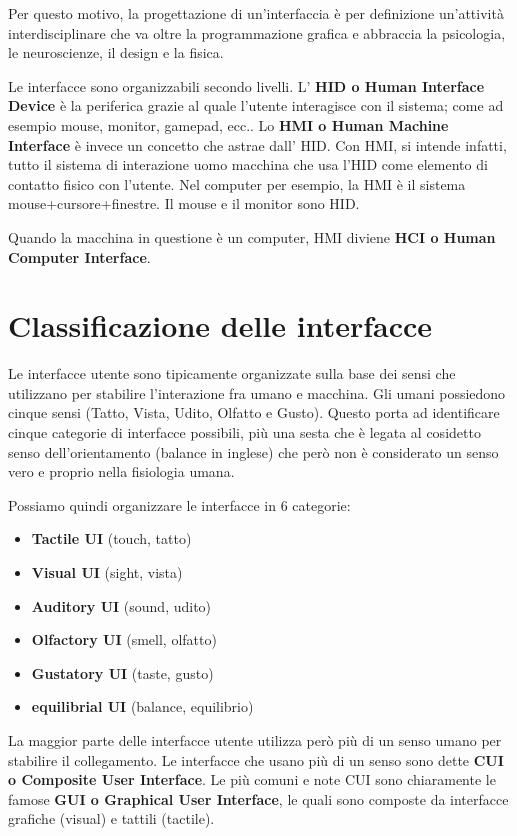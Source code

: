 Per questo motivo, la progettazione di un'interfaccia è per definizione un'attività interdisciplinare che va oltre la programmazione grafica e abbraccia la psicologia, le neuroscienze, il design e la fisica.

Le interfacce sono organizzabili secondo livelli. L' \textbf{HID o Human Interface Device} è la periferica grazie al quale l'utente interagisce con il sistema; come ad esempio mouse, monitor, gamepad, ecc.. Lo \textbf{HMI o Human Machine Interface} è invece un concetto che astrae dall' HID. Con HMI, si intende infatti, tutto il sistema di interazione uomo macchina che usa l'HID come elemento di contatto fisico con l'utente. Nel computer per esempio, la HMI è il sistema mouse+cursore+finestre. Il mouse e il monitor sono HID.

Quando la macchina in questione è un computer, HMI diviene \textbf{HCI o Human Computer Interface}.

\section{Classificazione delle interfacce}
Le interfacce utente sono tipicamente organizzate sulla base dei sensi che utilizzano per stabilire l'interazione fra umano e macchina. Gli umani possiedono cinque sensi (Tatto, Vista, Udito, Olfatto e Gusto). Questo porta ad identificare cinque categorie di interfacce possibili, più una sesta che è legata al cosidetto senso dell'orientamento (balance in inglese) che però non è considerato un senso vero e proprio nella fisiologia umana.

Possiamo quindi organizzare le interfacce in 6 categorie:
\begin{itemize}
	\item \textbf{Tactile UI} (touch, tatto)
	\item \textbf{Visual UI} (sight, vista)
	\item \textbf{Auditory UI} (sound, udito)
	\item \textbf{Olfactory UI} (smell, olfatto)
	\item \textbf{Gustatory UI} (taste, gusto)
	\item \textbf{equilibrial UI} (balance, equilibrio)
\end{itemize}

La maggior parte delle interfacce utente utilizza però più di un senso umano per stabilire il collegamento. Le interfacce che usano più di un senso sono dette \textbf{CUI o Composite User Interface}.
Le più comuni e note CUI sono chiaramente le famose \textbf{GUI o Graphical User Interface}, le quali sono composte da interfacce grafiche (visual) e tattili (tactile). 

